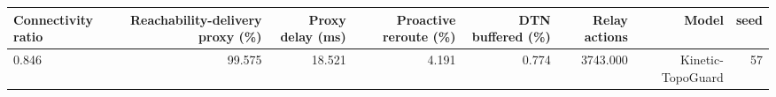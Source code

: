\begin{tabular}{lrrrrrrr}
\toprule
Connectivity ratio & Reachability-delivery proxy (\%) & Proxy delay (ms) & Proactive reroute (\%) & DTN buffered (\%) & Relay actions & Model & seed \\
\midrule
0.846 & 99.575 & 18.521 & 4.191 & 0.774 & 3743.000 & Kinetic-TopoGuard & 57 \\
\bottomrule
\end{tabular}